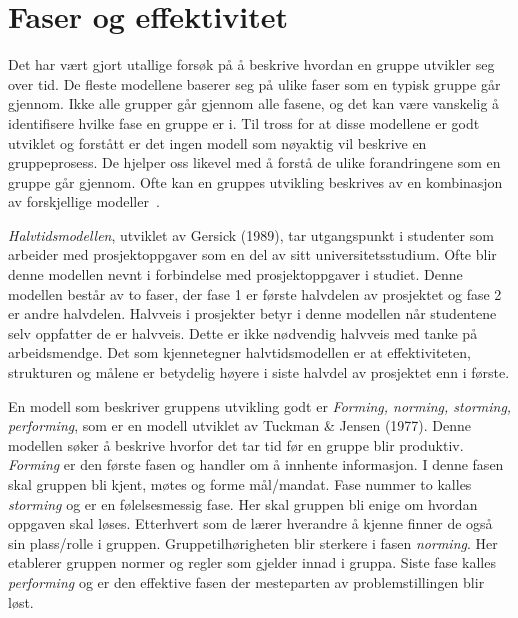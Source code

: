 \section{Faser og effektivitet}
Det har vært gjort utallige forsøk på å beskrive hvordan en gruppe utvikler seg over tid. 
De fleste modellene baserer seg på ulike faser som en typisk gruppe går gjennom. 
Ikke alle grupper går gjennom alle fasene, og det kan være vanskelig å identifisere hvilke fase en gruppe er i.
Til tross for at disse modellene er godt utviklet og forstått er det ingen modell som nøyaktig vil beskrive en gruppeprosess.
De hjelper oss likevel med å forstå de ulike forandringene som en gruppe går gjennom. 
Ofte kan en gruppes utvikling beskrives av en kombinasjon av forskjellige modeller~\citep{levin}. 
\vspace{\secspace}

\textit{Halvtidsmodellen}, utviklet av Gersick (1989), tar utgangspunkt i studenter som arbeider med prosjektoppgaver som en del av sitt universitetsstudium.
Ofte blir denne modellen nevnt i forbindelse med prosjektoppgaver i studiet. 
Denne modellen består av to faser, der fase 1 er første halvdelen av prosjektet og fase 2 er andre halvdelen. 
Halvveis i prosjekter betyr i denne modellen når studentene selv oppfatter de er halvveis.
Dette er ikke nødvendig halvveis med tanke på arbeidsmendge. 
Det som kjennetegner halvtidsmodellen er at effektiviteten, strukturen og målene er betydelig høyere i siste halvdel av prosjektet enn i første.\citep{levin}
\vspace{\secspace}

En modell som beskriver gruppens utvikling godt er \textit{Forming, norming, storming, performing}, som er en modell utviklet av Tuckman \& Jensen (1977). 
Denne modellen søker å beskrive hvorfor det tar tid før en gruppe blir produktiv. 
\textit{Forming} er den første fasen og handler om å innhente informasjon. 
I denne fasen skal gruppen bli kjent, møtes og forme mål/mandat.
Fase nummer to kalles \textit{storming} og er en følelsesmessig fase. 
Her skal gruppen bli enige om hvordan oppgaven skal løses. 
Etterhvert som de lærer hverandre å kjenne finner de også sin plass/rolle i gruppen. 
Gruppetilhørigheten blir sterkere i fasen \textit{norming}. 
Her etablerer gruppen normer og regler som gjelder innad i gruppa. 
Siste fase kalles \textit{performing} og er den effektive fasen der mesteparten av problemstillingen blir løst.~\citep{levin}
\vspace{\secspace}


